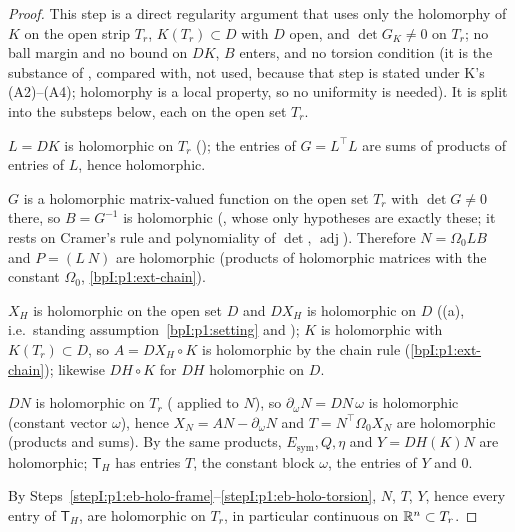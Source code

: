 \begin{proof}
\label{stepI:p1:eb-holo}
\sloppy This step is a direct regularity argument that uses only the holomorphy of $K$ on the open strip $T_r$, $K(T_r)\subset D$ with $D$ open, and $\det G_K\ne0$ on $T_r$; no ball margin and no bound on $DK$, $B$ enters, and no torsion condition (it is the substance of , compared with, not used, because that step is stated under K's (A2)--(A4); holomorphy is a local property, so no uniformity is needed). It is split into the substeps below, each on the open set $T_r$.

\label{stepI:p1:eb-holo-frame}
$L=DK$ is holomorphic on $T_r$ (); the entries of $G=L^\top L$ are sums of products of entries of $L$, hence holomorphic.

\label{stepI:p1:eb-holo-inverse}
$G$ is a holomorphic matrix-valued function on the open set $T_r$ with $\det G\ne0$ there, so $B=G^{-1}$ is holomorphic (, whose only hypotheses are exactly these; it rests on Cramer's rule and polynomiality of $\det$, $\operatorname{adj}$). Therefore $N=\Omega_0LB$ and $P=(L\ N)$ are holomorphic (products of holomorphic matrices with the constant $\Omega_0$, \ref{bpI:p1:ext-chain}).

\label{stepI:p1:eb-holo-field}
$X_H$ is holomorphic on the open set $D$ and $DX_H$ is holomorphic on $D$ ((a), i.e.\ standing assumption~\ref{bpI:p1:setting} and ); $K$ is holomorphic with $K(T_r)\subset D$, so $A=DX_H\circ K$ is holomorphic by the chain rule (\ref{bpI:p1:ext-chain}); likewise $DH\circ K$ for $DH$ holomorphic on $D$.

\label{stepI:p1:eb-holo-torsion}
$DN$ is holomorphic on $T_r$ ( applied to $N$), so $\partial_\omega N=DN\,\omega$ is holomorphic (constant vector $\omega$), hence $X_N=AN-\partial_\omega N$ and $T=N^\top\Omega_0X_N$ are holomorphic (products and sums). By the same products, $E_{\mathrm{sym}},Q,\eta$ and $Y=DH(K)N$ are holomorphic; $\mathsf T_H$ has entries $T$, the constant block $\omega$, the entries of $Y$ and $0$.

\label{stepI:p1:eb-holo-conclude}
By Steps~\ref{stepI:p1:eb-holo-frame}--\ref{stepI:p1:eb-holo-torsion}, $N$, $T$, $Y$, hence every entry of $\mathsf T_H$, are holomorphic on $T_r$, in particular continuous on $\mathbb{R}^n\subset T_r$.


\end{proof}
